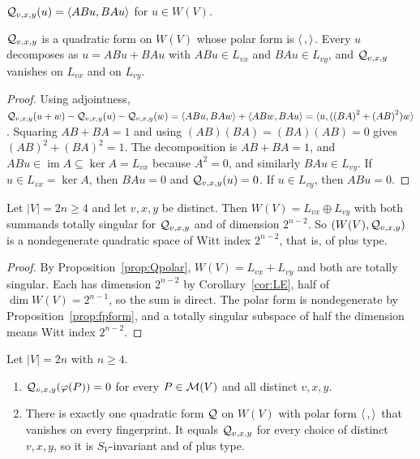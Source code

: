 \begin{definition}\label{def:Q}
$\mathcal{Q}_{v,x,y}(u)=\langle ABu,BAu\rangle$ for $u\in W(V)$.
\end{definition}

\begin{proposition}\label{prop:Qpolar}
$\mathcal{Q}_{v,x,y}$ is a quadratic form on $W(V)$ whose polar form is $\langle\,,\rangle$. Every $u$ decomposes as $u=ABu+BAu$ with $ABu\in L_{vx}$ and $BAu\in L_{vy}$, and $\mathcal{Q}_{v,x,y}$ vanishes on $L_{vx}$ and on $L_{vy}$.
\end{proposition}

\begin{proof}
Using adjointness, $\mathcal{Q}_{v,x,y}(u+w)-\mathcal{Q}_{v,x,y}(u)-\mathcal{Q}_{v,x,y}(w)=\langle ABu,BAw\rangle+\langle ABw,BAu\rangle=\langle u,({(BA)}^2+{(AB)}^2)w\rangle$. Squaring $AB+BA=1$ and using $(AB)(BA)=(BA)(AB)=0$ gives ${(AB)}^2+{(BA)}^2=1$. The decomposition is $AB+BA=1$, and $ABu\in\operatorname{im}A\subseteq\ker A=L_{vx}$ because $A^2=0$, and similarly $BAu\in L_{vy}$. If $u\in L_{vx}=\ker A$, then $BAu=0$ and $\mathcal{Q}_{v,x,y}(u)=0$. If $u\in L_{vy}$, then $ABu=0$.
\end{proof}

\begin{theorem}\label{thm:plustype}
Let $|V|=2n\ge4$ and let $v,x,y$ be distinct. Then $W(V)=L_{vx}\oplus L_{vy}$ with both summands totally singular for $\mathcal{Q}_{v,x,y}$ and of dimension $2^{n-2}$. So $(W(V),\mathcal{Q}_{v,x,y})$ is a nondegenerate quadratic space of Witt index $2^{n-2}$, that is, of plus type.
\end{theorem}

\begin{proof}
By Proposition~\ref{prop:Qpolar}, $W(V)=L_{vx}+L_{vy}$ and both are totally singular. Each has dimension $2^{n-2}$ by Corollary~\ref{cor:LE}, half of $\dim W(V)=2^{n-1}$, so the sum is direct. The polar form is nondegenerate by Proposition~\ref{prop:fpform}, and a totally singular subspace of half the dimension means Witt index $2^{n-2}$.
\end{proof}

\begin{theorem}\label{thm:Qunique}
Let $|V|=2n$ with $n\ge4$.
\begin{enumerate}
\item $\mathcal{Q}_{v,x,y}(\varphi(P))=0$ for every $P\in\mathcal{M}(V)$ and all distinct $v,x,y$.
\item There is exactly one quadratic form $\mathcal{Q}$ on $W(V)$ with polar form $\langle\,,\rangle$ that vanishes on every fingerprint. It equals $\mathcal{Q}_{v,x,y}$ for every choice of distinct $v,x,y$, so it is $S_V$-invariant and of plus type.
\end{enumerate}
\end{theorem}

